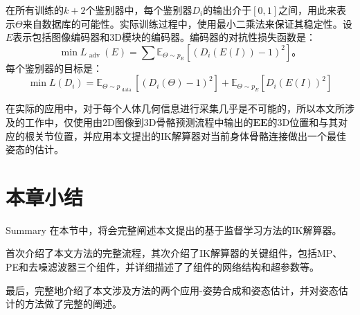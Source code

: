 \begin{itemize}
在所有训练的$k+2$个鉴别器中，每个鉴别器$D_i$的输出介于$[0,1]$之间，用此来表示$\Theta$来自数据库的可能性。实际训练过程中，使用最小二乘法来保证其稳定性。设$E$表示包括图像编码器和3D模块的编码器。编码器的对抗性损失函数是：\begin{equation}
\min L_{\text { adv }}(E)=\sum \mathbb{E}_{\Theta \sim p_{E}}\left[\left(D_{i}(E(I))-1\right)^{2}\right]。
\end{equation}
每个鉴别器的目标是：\begin{equation}
\min L\left(D_{i}\right)=\mathbb{E}_{\Theta \sim p_{\text { data }}}\left[\left(D_{i}(\Theta)-1\right)^{2}\right]+\mathbb{E}_{\Theta \sim p_{E}}\left[D_{i}(E(I))^{2}\right]
\end{equation}
\end{itemize}


在实际的应用中，对于每个人体几何信息进行采集几乎是不可能的，所以本文所涉及的工作中，仅使用由2D图像到3D骨骼预测流程中输出的$\mathbf{EE}$的3D位置和与其对应的根关节位置，并应用本文提出的IK解算器对当前身体骨骼连接做出一个最佳姿态的估计。

\section{本章小结}{Summary}
在本节中，将会完整阐述本文提出的基于监督学习方法的IK解算器。

首次介绍了本文方法的完整流程，其次介绍了IK解算器的关键组件，包括MP、PE和去噪滤波器三个组件，并详细描述了了组件的网络结构和超参数等。

最后，完整地介绍了本文涉及方法的两个应用-姿势合成和姿态估计，并对姿态估计的方法做了完整的阐述。
